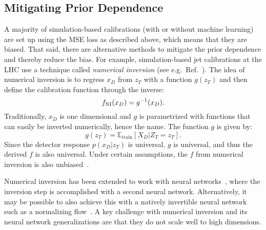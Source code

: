 \documentclass[aps,prd,reprint,preprintnumbers,superscriptaddress,nofootinbib,longbibliography,floatfix]{revtex4-1}
\DeclareRobustCommand{\Ref}[1]{Ref.~\cite{#1}}
\begin{document}
\subsection{Mitigating Prior Dependence}

A majority of simulation-based calibrations (with or without machine learning) are set up using the MSE loss as described above, which means that they are biased.
%
That said, there are alternative methods to mitigate the prior dependence and thereby reduce the bias.
%
For example, simulation-based jet calibrations at the LHC use a technique called \textit{numerical inversion} (see e.g.\ \Ref{1609.05195}).
%
The idea of numerical inversion is to regress $x_D$ from $z_T$ with a function $g(z_T)$ and then define the calibration function through the inverse:
%
\begin{equation}
    f_{\rm NI}(x_D)=g^{-1}(x_D).
\end{equation}
%
Traditionally, $x_D$ is one dimensional and $g$ is parametrized with functions that can easily be  inverted numerically, hence the name.
%
The function $g$ is given by:
%
\begin{equation}
\label{eq:NI_sol}
g(z_T)=\mathbb{E}_{\text{train}}[X_D|Z_T = z_T].
\end{equation}
%
Since the detector response $p(x_D|z_T)$ is universal, $g$ is universal, and thus the derived $f$ is also universal.
%
Under certain assumptions, the $f$ from numerical inversion is also unbiased~\cite{1609.05195}.


Numerical inversion has been extended to work with neural networks~\cite{ATL-PHYS-PUB-2018-013,ATL-PHYS-PUB-2020-001}, where the inversion step is accomplished with a second neural network.
%
Alternatively, it may be possible to also achieve this with a natively invertible neural network such as a normalizing flow~\cite{10.5555/3045118.3045281,Kobyzev2020}.
%
A key challenge with numerical inversion and its neural network generalizations are that they do not scale well to high dimensions.
\end{document}
